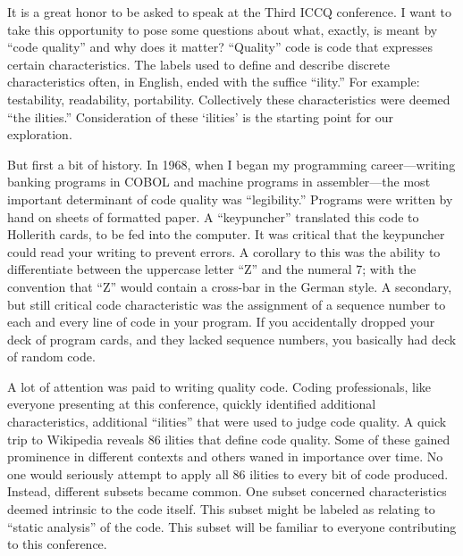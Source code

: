 \cleardoublepage
{}

It is a great honor to be asked to speak at the Third ICCQ conference. I want to take this
opportunity to pose some questions about what, exactly, is meant by ``code quality'' and why does it matter?
``Quality'' code is code that expresses certain characteristics. The labels used to define
and describe discrete characteristics often, in English, ended with the suffice ``ility.''
For example: testability, readability, portability. Collectively these characteristics were
deemed ``the ilities.'' Consideration of these ‘ilities’ is the starting point for our exploration.

But first a bit of history. In 1968, when I began my programming career—writing banking programs in COBOL and machine programs in assembler—the most important determinant of code quality was ``legibility.''
Programs were written by hand on sheets of formatted paper. A ``keypuncher'' translated this code to Hollerith cards, to be fed into the computer. It was critical that the keypuncher  could read your writing to prevent errors. A corollary to this was the ability to differentiate between the uppercase letter ``Z'' and the numeral 7; with the convention that ``Z'' would contain a cross-bar in the German style.
A secondary, but still critical code characteristic was the assignment of a sequence number to each and every
line of code in your program. If you accidentally dropped your deck of program cards, and
they lacked sequence numbers, you basically had deck of random code.

A lot of attention was paid to writing quality code. Coding professionals, like everyone presenting at this conference, quickly identified additional characteristics, additional ``ilities'' that were used to judge code quality. A quick trip to Wikipedia reveals 86 ilities that define code quality. Some of these gained prominence in different contexts and others waned in importance over time.
No one would seriously attempt to apply all 86 ilities to every bit of code produced. Instead, different subsets became common. One subset concerned characteristics deemed intrinsic to the code itself. This subset might be labeled as relating to ``static analysis'' of the code. This subset will be familiar to everyone contributing to this conference.

